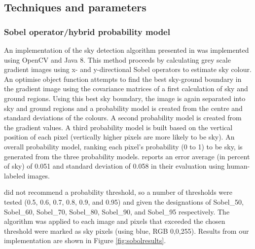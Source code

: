\documentclass[final,3p,times,authoryear]{elsarticle}
\begin{document}
\subsection{Techniques and parameters}
\subsubsection{\cite{Wang2015a} Sobel operator/hybrid probability model}\label{sec:prob}
An implementation of the sky detection algorithm presented in \cite{Wang2015a} was implemented using OpenCV and Java 8. This method proceeds by calculating grey scale gradient images using x- and y-directional Sobel operators to estimate sky colour. An optimise object function attempts to find the best sky-ground boundary in the gradient image using the covariance matrices of a first calculation of sky and ground regions. Using this best sky boundary, the image is again separated into sky and ground regions and a probability model is created from the centre and standard deviations of the colours. A second probability model is created from the gradient values. A third probability model is built based on the vertical position of each pixel (vertically higher pixels are more likely to be sky). An overall probability model, ranking each pixel's probability (0 to 1) to be sky, is generated from the three probability models. \cite{Wang2015a} reports an error average (in percent of sky) of 0.051 and standard deviation of 0.058 in their evaluation using human-labeled images.  

\cite{Wang2015a} did not recommend a probability threshold, so a number of thresholds were tested (0.5, 0.6, 0.7, 0.8, 0.9, and 0.95) and given the designations of Sobel\_50, Sobel\_60, Sobel\_70, Sobel\_80, Sobel\_90, and Sobel\_95 respectively. The algorithm was applied to each image and pixels that exceeded the chosen threshold were marked as sky pixels (using blue, RGB 0,0,255). Results from our implementation are shown in Figure \ref{fig:sobolresults}. 


\end{document}
